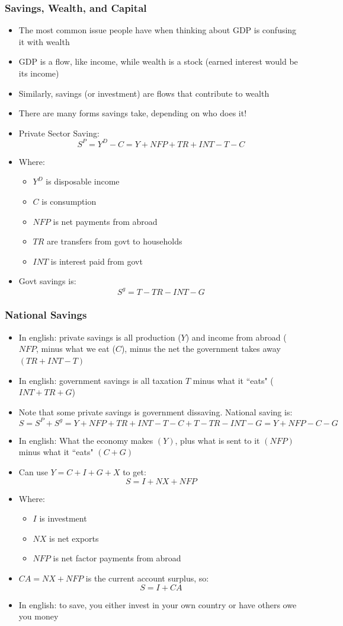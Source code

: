\documentclass{beamer}
\begin{document}
    \begin{frame}
\frametitle[alignment=center]{Savings, Wealth, and Capital}
\begin{itemize}
\item The most common issue people have when thinking about GDP is confusing it with wealth
\item GDP is a flow, like income, while wealth is a stock (earned interest would be its income)
\item Similarly, savings (or investment) are flows that contribute to wealth
\item There are many forms savings take, depending on who does it!
\item Private Sector Saving:
$$S^P=Y^D-C=Y+NFP+TR+INT-T-C$$
\item Where:
\begin{itemize}
\item $Y^D$ is disposable income
\item $C$ is consumption
\item $NFP$ is net payments from abroad
\item $TR$ are transfers from govt to households
\item $INT$ is interest paid from govt
\end{itemize}
\item Govt savings is:
$$S^g=T-TR-INT-G$$
\end{itemize}
\end{frame}


    \begin{frame}
\frametitle[alignment=center]{National Savings}
\begin{itemize}
\item In english:  private savings is all production ($Y$) and income from abroad ($NFP$, minus what we eat ($C$), minus the net the government takes away $(TR+INT-T)$
\item In english: government savings is all taxation $T$ minus what it ``eats" ($INT+TR+G$)
\item Note that some private savings is government dissaving.  National saving is:
$$S=S^P+S^g=Y+NFP+TR+INT-T-C+T-TR-INT-G=Y+NFP-C-G$$
\item In english:  What the economy makes $(Y)$, plus what is sent to it $(NFP)$ minus what it ``eats" $(C+G)$
\item Can use $Y=C+I+G+X$ to get:
$$S=I+NX+NFP$$
\item Where:
\begin{itemize}
\item $I$ is investment
\item $NX$ is net exports
\item $NFP$ is net factor payments from abroad
\end{itemize}
\item $CA=NX+NFP$ is the current account surplus, so:
$$S=I+CA$$
\item In english:  to save, you either  invest in your own country or have others owe you money
\end{itemize}
\end{frame}
\end{document}
